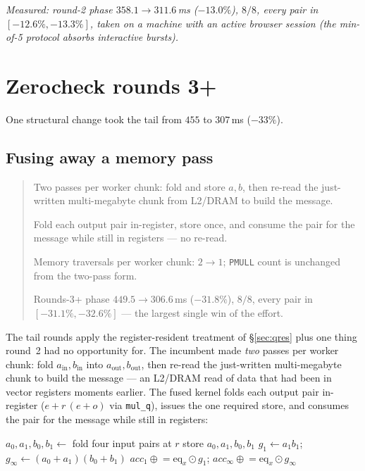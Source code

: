 \documentclass[11pt]{article}
\newcommand{\eq}{\mathrm{eq}}
\newcommand{\code}[1]{\texttt{#1}}
\newenvironment{optsummary}{%
  \begin{quote}\small
  \begin{description}
  \setlength{\itemsep}{1pt}\setlength{\parsep}{0pt}\setlength{\topsep}{2pt}
}{%
  \end{description}
  \end{quote}
}
\begin{document}
\emph{Measured: round-2 phase $358.1\to311.6\,$ms ($-13.0\%$), $8/8$, every
pair in $[-12.6\%,-13.3\%]$, taken on a machine with an active browser
session (the min-of-5 protocol absorbs interactive bursts).}

\section{Zerocheck rounds 3+}

One structural change took the tail from $455$ to $307$\,ms ($-33\%$).

\subsection{Fusing away a memory pass}\label{sec:tailfuse}

\begin{optsummary}
\item[Baseline:] Two passes per worker chunk: fold and store $a,b$, then re-read the just-written multi-megabyte chunk from L2/DRAM to build the message.
\item[Improvement:] Fold each output pair in-register, store once, and consume the pair for the message while still in registers --- no re-read.
\item[Mechanism:] Memory traversals per worker chunk: $2\to1$; \code{PMULL} count is unchanged from the two-pass form.
\item[Result:] Rounds-3+ phase $449.5\to306.6\,$ms ($-31.8\%$), $8/8$, every pair in $[-31.1\%,-32.6\%]$ --- the largest single win of the effort.
\end{optsummary}

The tail rounds apply the register-resident treatment of \S\ref{sec:qres}
plus one thing round~2 had no opportunity for. The incumbent made \emph{two} passes per worker chunk:
fold $a_{\mathrm{in}},b_{\mathrm{in}}$ into $a_{\mathrm{out}},b_{\mathrm{out}}$,
then re-read the just-written multi-megabyte chunk to build the message ---
an L2/DRAM read of data that had been in vector registers moments earlier.
The fused kernel folds each output pair in-register
($e + r\,(e+o)$ via \code{mul\_q}), issues the one required store, and
consumes the pair for the message while still in registers:

\begin{algorithmic}[1]
  \State $a_0,a_1,b_0,b_1 \gets$ fold four input pairs at $r$
  \State store $a_0,a_1,b_0,b_1$ 
  \State $g_1 \gets a_1 b_1$;\quad
         $g_\infty \gets (a_0{+}a_1)(b_0{+}b_1)$
         \Comment{\code{mul\_q}, never leaving registers}
  \State $\mathit{acc}_1 \mathrel{\oplus}= \eq_x \odot g_1$;\quad
         $\mathit{acc}_\infty \mathrel{\oplus}= \eq_x \odot g_\infty$
\EndFor
\end{algorithmic}
\end{document}
